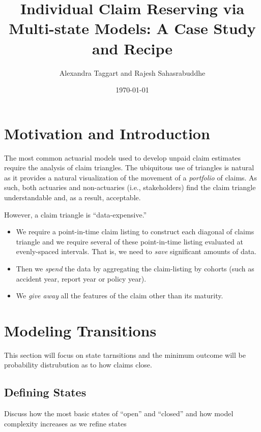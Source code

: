 \documentclass[
]{article}
\title{Individual Claim Reserving via Multi-state Models: \n A Case Study and
Recipe}
\author{Alexandra Taggart and Rajesh Sahasrabuddhe}
\date{\today}
\begin{document}
\maketitle

\hypertarget{motivation-and-introduction}{%
\section{Motivation and
Introduction}\label{motivation-and-introduction}}

The most common actuarial models used to develop unpaid claim estimates
require the analysis of claim triangles. The ubiquitous use of triangles
is natural as it provides a natural visualization of the movement of a
\emph{portfolio} of claims. As such, both actuaries and non-actuaries
(i.e., stakeholders) find the claim triangle understandable and, as a
result, acceptable.

However, a claim triangle is ``data-expensive.''

\begin{itemize}
\item
  We require a point-in-time claim listing to construct each diagonal of
  claims triangle and we require several of these point-in-time listing
  evaluated at evenly-spaced intervals. That is, we need to \emph{save}
  significant amounts of data.
\item
  Then we \emph{spend} the data by aggregating the claim-listing by
  cohorts (such as accident year, report year or policy year).
\item
  We \emph{give away} all the features of the claim other than its
  maturity.
\end{itemize}

\hypertarget{modeling-transitions}{%
\section{Modeling Transitions}\label{modeling-transitions}}

This section will focus on state tarnsitions and the minimum outcome
will be probability distrubution as to how claims close.

\hypertarget{defining-states}{%
\subsection{Defining States}\label{defining-states}}

Discuss how the most basic states of ``open'' and ``closed'' and how
model complexity increases as we refine states
\end{document}
